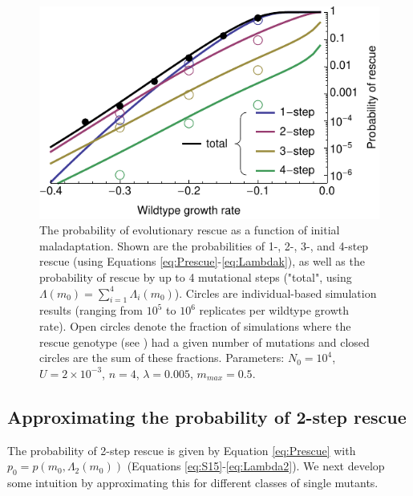 \documentclass[9pt,twocolumn,twoside,lineno]{gsajnl}
\begin{document}
\begin{figure}[htb]
\centering
\includegraphics[width=\linewidth]{4stepNormalU_sims.pdf}
\caption{
The probability of evolutionary rescue as a function of initial maladaptation.
Shown are the probabilities of 1-, 2-, 3-, and 4-step rescue (using Equations \ref{eq:Prescue}-\ref{eq:Lambdak}), as well as the probability of rescue by up to 4 mutational steps ("total", using $\Lambda(m_0) = \sum_{i=1}^4 \Lambda_i(m_0)$).
Circles are individual-based simulation results (ranging from $10^5$ to $10^6$ replicates per wildtype growth rate).
Open circles denote the fraction of simulations where the rescue genotype (see ) had a given number of mutations and closed circles are the sum of these fractions.
Parameters: $N_0=10^4$, $U=2\times10^{-3}$, $n=4$, $\lambda=0.005$, $m_{max}=0.5$.
}%
\label{fig:1vs2m0}
\end{figure}

\subsection{Approximating the probability of 2-step rescue}
\label{sec:approx2step}

The probability of 2-step rescue is given by Equation \ref{eq:Prescue} with $p_0=p(m_0,\Lambda_2(m_0))$ (Equations \ref{eq:S15}-\ref{eq:Lambda2}).
We next develop some intuition by approximating this for different classes of single mutants.
\end{document}
